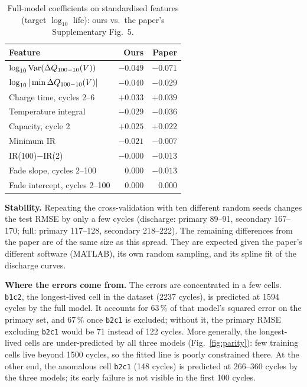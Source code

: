 \begin{table}[t]
\centering
\caption{Full-model coefficients on standardised features (target
$\log_{10}$ life): ours vs.\ the paper's Supplementary Fig.~5.}
\label{tab:coef}
\begin{tabular}{@{}lrr@{}}
\toprule
Feature & Ours & Paper \\
\midrule
$\log_{10}\mathrm{Var}(\Delta Q_{100-10}(V))$ & $-0.049$ & $-0.071$ \\
$\log_{10}|\min\Delta Q_{100-10}(V)|$ & $-0.040$ & $-0.029$ \\
Charge time, cycles 2--6 & $+0.033$ & $+0.039$ \\
Temperature integral & $-0.029$ & $-0.036$ \\
Capacity, cycle 2 & $+0.025$ & $+0.022$ \\
Minimum IR & $-0.021$ & $-0.007$ \\
IR(100)$-$IR(2) & $-0.000$ & $-0.013$ \\
Fade slope, cycles 2--100 & $0.000$ & $-0.013$ \\
Fade intercept, cycles 2--100 & $0.000$ & $0.000$ \\
\bottomrule
\end{tabular}
\end{table}

\textbf{Stability.} Repeating the cross-validation with ten different random
seeds changes the test RMSE by only a few cycles (discharge: primary 89--91,
secondary 167--170; full: primary 117--128, secondary 218--222). The
remaining differences from the paper are of the same size as this spread.
They are expected given the paper's different software (MATLAB), its own
random sampling, and its spline fit of the discharge curves.

\textbf{Where the errors come from.} The errors are concentrated in a few
cells. \texttt{b1c2}, the longest-lived cell in the dataset (2237 cycles), is
predicted at 1594 cycles by the full model. It accounts for 63\,\% of that
model's squared error on the primary set, and 67\,\% once \texttt{b2c1} is
excluded; without it, the primary RMSE excluding \texttt{b2c1} would be 71
instead of 122 cycles. More generally, the longest-lived cells are
under-predicted by all three models (Fig.~\ref{fig:parity}): few training
cells live beyond 1500 cycles, so the fitted line is poorly constrained
there. At the other end, the anomalous cell \texttt{b2c1} (148 cycles) is
predicted at 266--360 cycles by the three models; its early failure is not
visible in the first 100 cycles.

